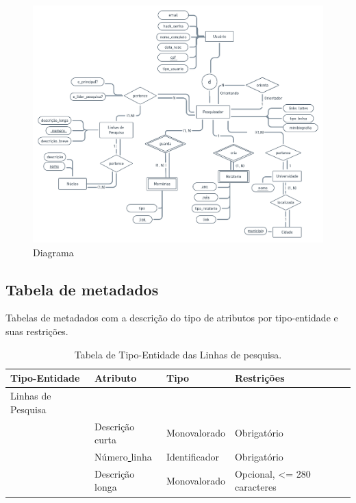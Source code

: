 \documentclass[11pt]{../../classes/ifscarticle}
\begin{document}
\begin{figure}[ht]
    \centering
    \includegraphics[width=19cm]{figuras/Diagrama.png}
    \caption{Diagrama}
    \label{fig:logolatex}
\end{figure}
\clearpage
\subsection{Tabela de metadados}
Tabelas de metadados com a descrição do tipo
de atributos por tipo-entidade e suas restrições.

\begin{table}[h]
    \centering
    \vspace{0.5cm}
    \begin{tabular}{ |p{}|p{3cm}|p{4cm}|p{}|  }
        Tipo-Entidade & Atributo                              & Tipo          & Restrições                                       \\ %

        \hline
        Linhas \linebreak de Pesquisa
                      &                                       &               &                                                  \\
                      & Descrição curta                       & Monovalorado  & Obrigatório                        \linebreak    \\
                      & Número\underline{ }\underline{ }linha & Identificador & Obrigatório                         \linebreak   \\
                      & Descrição longa                       & Monovalorado  & Opcional, <= 280 caracteres           \linebreak \\
        \hline
    \end{tabular}
    \caption{Tabela de Tipo-Entidade das Linhas de pesquisa.}
\end{table}
\end{document}
